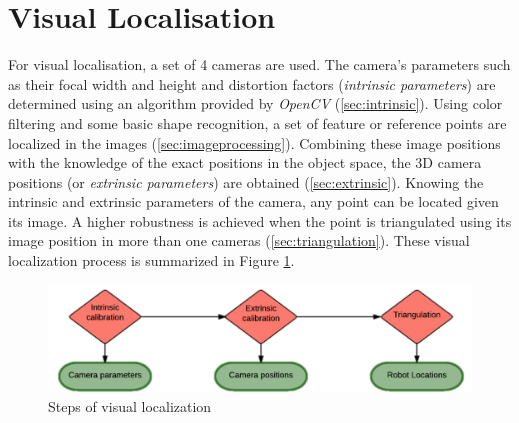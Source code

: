 \section{Visual Localisation}

For visual localisation, a set of 4 cameras are used. The camera's parameters such as their focal width and height and distortion factors (\textit{intrinsic parameters}) are determined using an algorithm provided by \textit{OpenCV} (\ref{sec:intrinsic}). 
Using color filtering and some basic shape recognition, a set of feature or reference points are localized in the images (\ref{sec:imageprocessing}).
Combining these image positions with the knowledge of the exact positions in the object space, the 3D camera positions (or \textit{extrinsic parameters}) are obtained (\ref{sec:extrinsic}). 
Knowing the intrinsic and extrinsic parameters of the camera, any point can be located given its image. A higher robustness is achieved when the point is triangulated using its image position in more than one cameras (\ref{sec:triangulation}).
These visual localization process is summarized in Figure \ref{fig:visual}.
\begin{figure}[H]
    \centering
    \includegraphics[width=.6\linewidth]{files/Visual.png}
    \caption{Steps of visual localization}
    \label{fig:visual}
\end{figure}










